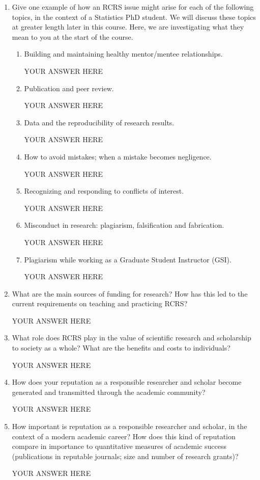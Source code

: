 \documentclass[12pt]{article}
\begin{document}
\begin{enumerate}
\item Give one example of how an RCRS issue might arise for each of the following topics, in the context of a Statistics PhD student. We will discuss these topics at greater length later in this course. Here, we are investigating what they mean to you at the start of the course.
\begin{enumerate}
\item Building and maintaining healthy mentor/mentee relationships.

YOUR ANSWER HERE

\item Publication and peer review. 

YOUR ANSWER HERE

\item Data and the reproducibility of research results.

YOUR ANSWER HERE

\item How to avoid mistakes; when a mistake becomes negligence.

YOUR ANSWER HERE

\item Recognizing and responding to conflicts of interest.

YOUR ANSWER HERE

\item Misconduct in research: plagiarism, falsification and fabrication.

YOUR ANSWER HERE

\item Plagiarism while working as a Graduate Student Instructor (GSI).

YOUR ANSWER HERE

\end{enumerate}

\item What are the main sources of funding for research? How has this led to the current requirements on teaching and practicing RCRS?

YOUR ANSWER HERE

\item What role does RCRS play in the value of scientific research and scholarship to society as a whole? What are the benefits and costs to individuals?


YOUR ANSWER HERE

\item How does your reputation as a responsible researcher and scholar become generated and transmitted through the academic community?

YOUR ANSWER HERE

\item How important is reputation as a responsible researcher and scholar, in the context of a modern academic career? How does this kind of reputation compare in importance to quantitative measures of academic success (publications in reputable journals; size and number of research grants)? 

YOUR ANSWER HERE

\end{enumerate}
\end{document}
